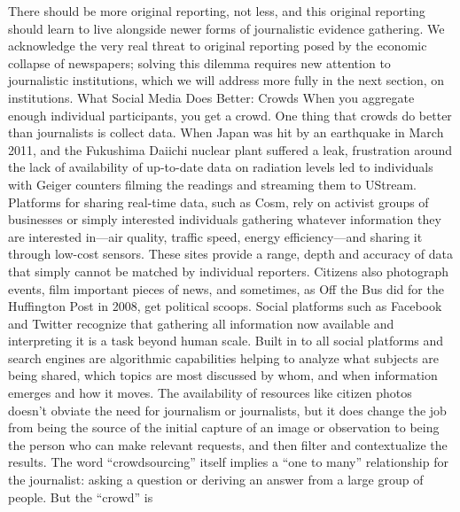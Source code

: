 There should be more original reporting, not less, and this original reporting
should learn to live alongside newer forms of journalistic evidence gathering.
We acknowledge the very real threat to original reporting posed by the economic
collapse of newspapers; solving this dilemma requires new attention to
journalistic institutions, which we will address more fully in the next section,
on institutions.
What Social Media Does Better: Crowds
When you aggregate enough individual participants, you get a crowd. One thing
that crowds do better than journalists is collect data. When Japan was hit by an
earthquake in March 2011, and the Fukushima Daiichi nuclear plant suffered a
leak, frustration around the lack of availability of up-to-date data on radiation
levels led to individuals with Geiger counters filming the readings and streaming
them to UStream.
Platforms for sharing real-time data, such as Cosm, rely on activist groups of businesses
or simply interested individuals gathering whatever information they are
interested in—air quality, traffic speed, energy efficiency—and sharing it through
low-cost sensors. These sites provide a range, depth and accuracy of data that
simply cannot be matched by individual reporters.
Citizens also photograph events, film important pieces of news, and sometimes,
as Off the Bus did for the Huffington Post in 2008, get political scoops. Social
platforms such as Facebook and Twitter recognize that gathering all information
now available and interpreting it is a task beyond human scale. Built in to all
social platforms and search engines are algorithmic capabilities helping to analyze
what subjects are being shared, which topics are most discussed by whom, and
when information emerges and how it moves.
The availability of resources like citizen photos doesn’t obviate the need for
journalism or journalists, but it does change the job from being the source of the
initial capture of an image or observation to being the person who can make
relevant requests, and then filter and contextualize the results. The word ``crowdsourcing''
itself implies a ``one to many'' relationship for the journalist: asking a
question or deriving an answer from a large group of people. But the ``crowd'' is

